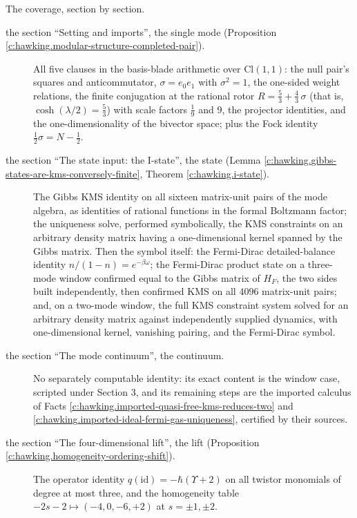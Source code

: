 \documentclass[11pt]{article}
\theoremstyle{definition}
\theoremstyle{plain}
\providecommand{\Cl}{}\renewcommand{\Cl}{\mathrm{Cl}}
\providecommand{\id}{}\renewcommand{\id}{\mathrm{id}}
\begin{document}
The coverage, section by section.

\begin{description}
\item[the section ``Setting and imports'', the single mode (Proposition \ref{c:hawking.modular-structure-completed-pair}).] All five clauses in the basis-blade arithmetic over $\Cl(1,1)$: the null pair's squares and anticommutator, $\sigma = e_0e_1$ with $\sigma^2 = 1$, the one-sided weight relations, the finite conjugation at the rational rotor $R = \tfrac53 + \tfrac43\,\sigma$ (that is, $\cosh(\lambda/2) = \tfrac53$) with scale factors $\tfrac19$ and $9$, the projector identities, and the one-dimensionality of the bivector space; plus the Fock identity $\tfrac12\sigma = N - \tfrac12$.
\item[the section ``The state input: the I-state'', the state (Lemma \ref{c:hawking.gibbs-states-are-kms-conversely-finite}, Theorem \ref{c:hawking.i-state}).] The Gibbs KMS identity on all sixteen matrix-unit pairs of the mode algebra, as identities of rational functions in the formal Boltzmann factor; the uniqueness solve, performed symbolically, the KMS constraints on an arbitrary density matrix having a one-dimensional kernel spanned by the Gibbs matrix. Then the symbol itself: the Fermi-Dirac detailed-balance identity $n/(1-n) = e^{-\beta\omega}$; the Fermi-Dirac product state on a three-mode window confirmed equal to the Gibbs matrix of $H_F$, the two sides built independently, then confirmed KMS on all $4096$ matrix-unit pairs; and, on a two-mode window, the full KMS constraint system solved for an arbitrary density matrix against independently supplied dynamics, with one-dimensional kernel, vanishing pairing, and the Fermi-Dirac symbol.
\item[the section ``The mode continuum'', the continuum.] No separately computable identity: its exact content is the window case, scripted under Section 3, and its remaining steps are the imported calculus of Facts \ref{c:hawking.imported-quasi-free-kms-reduces-two} and \ref{c:hawking.imported-ideal-fermi-gas-uniqueness}, certified by their sources.
\item[the section ``The four-dimensional lift'', the lift (Proposition \ref{c:hawking.homogeneity-ordering-shift}).] The operator identity $q(\id) = -\hbar(\Upsilon + 2)$ on all twistor monomials of degree at most three, and the homogeneity table $-2s-2 \mapsto (-4, 0, -6, +2)$ at $s = \pm 1, \pm 2$.

\end{description}
\end{document}
